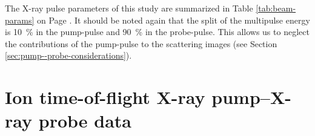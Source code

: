 %
The X-ray pulse parameters of this study are summarized in Table \ref{tab:beam-params} on Page \pageref{tab:beam-params}. It should be noted again that the split of the multipulse energy is \SI{10}{\percent} in the pump-pulse and \SI{90}{\percent} in the probe-pulse. This allows us to neglect the contributions of the pump-pulse to the scattering images (see Section \ref{sec:pump--probe-considerations}).
%
%
\section{Ion time-of-flight X-ray pump--X-ray probe data}\label{sec:itof-pump--probe}
